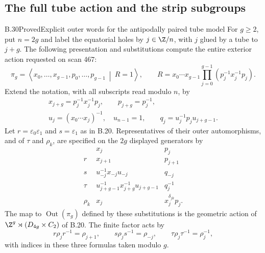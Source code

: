 \subsection{The full tube action and the strip subgroups}

\begin{claim}{B.30}{Proved}{Explicit outer words for the antipodally paired tube model}
For $g\ge2$, put $n=2g$ and label the equatorial holes by $j\in\Z/n$,
with $j$ glued by a tube to $j+g$. The following presentation and
substitutions compute the entire exterior action requested on scan 467:
\[
 \pi_g=\left\langle x_0,\ldots,x_{g-1},p_0,\ldots,p_{g-1}
 \ \middle|\ R=1\right\rangle,
 \qquad
 R=x_0\cdots x_{g-1}
   \prod_{j=0}^{g-1}(p_j^{-1}x_j^{-1}p_j).
\]
Extend the notation, with all subscripts read modulo $n$, by
\[
 \begin{gathered}
 x_{j+g}=p_j^{-1}x_j^{-1}p_j,\qquad p_{j+g}=p_j^{-1},\\
 u_j=(x_0\cdots x_j)^{-1},\quad u_{n-1}=1,\qquad
 q_j=u_j^{-1}p_j u_{j+g-1}.
 \end{gathered}
\]
Let $r=\varepsilon_0\varepsilon_1$ and $s=\varepsilon_1$ as in
B.20. Representatives of their outer automorphisms, and of $\tau$ and
$\rho_k$, are specified on the $2g$ displayed generators by
\[
\begin{array}{c|cc}
 &x_j&p_j\\ \hline
 r&x_{j+1}&p_{j+1}\\
 s&u_{-j}^{-1}x_{-j}u_{-j}&q_{-j}\\
 \tau&u_{j+g-1}^{-1}x_{j+g}^{-1}u_{j+g-1}&q_j^{-1}\\
 \rho_k&x_j&x_j^{\delta_{jk}}p_j.
\end{array}
\]
The map to $\operatorname{Out}(\pi_g)$ defined by these substitutions
is the geometric action of
$\Z^g\rtimes(D_{4g}\times C_2)$ of B.20. The finite factor acts by
\[
 r\rho_jr^{-1}=\rho_{j+1},\qquad
 s\rho_js^{-1}=\rho_{-j},\qquad
 \tau\rho_j\tau^{-1}=\rho_j^{-1},
\]
with indices in these three formulas taken modulo $g$.
\end{claim}
